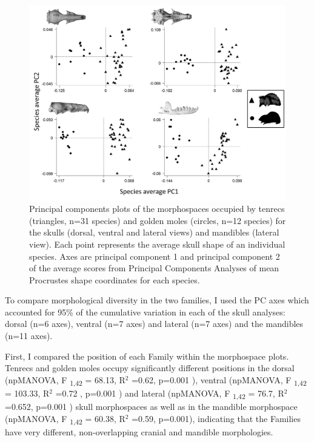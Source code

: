 	
	\begin{figure}[!htbp]
	\centering
	\includegraphics[width=1\linewidth, height=1\textheight, keepaspectratio]{Disparity/writing/figures/FourPCA_shapes.png}
	\caption[Morphospace (principal components) plot of morphological diversity in lateral views of tenrec and golden mole skulls.]
		{Principal components plots of the morphospaces occupied by tenrecs (triangles, n=31 species) and golden moles (circles, n=12 species) for the skulls (dorsal, ventral and lateral views) and mandibles (lateral view). Each point represents the average skull shape of an individual species. Axes are principal component 1 and principal component 2 of the average scores from Principal Components Analyses of mean Procrustes shape coordinates for each species.}
	\label{fig:FourPCA}
	\end{figure}

	To compare morphological diversity in the two families, I used the PC axes which accounted for 95\% of the cumulative variation in each of the skull analyses: dorsal (n=6 axes), ventral (n=7 axes) and lateral (n=7 axes) and the mandibles (n=11 axes).
	
	First, I compared the position of each Family within the morphospace plots. Tenrecs and golden moles occupy significantly different positions in the dorsal (npMANOVA, F \textsubscript{1,42} = 68.13, R$^2$ =0.62, p=0.001 ), ventral (npMANOVA, F \textsubscript{1,42} = 103.33, R$^2$ =0.72 , p=0.001 ) and lateral (npMANOVA, F \textsubscript{1,42} = 76.7, R$^2$ =0.652, p=0.001 ) skull morphospaces as well as in the mandible morphospace (npMANOVA, F \textsubscript{1,42} = 60.38, R$^2$ =0.59, p=0.001),  indicating that the Families have very different, non-overlapping cranial and mandible morphologies. 
	
